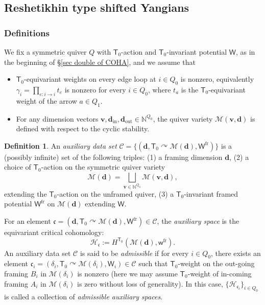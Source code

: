 \documentclass[10pt]{amsart}
\theoremstyle{definition}
\newtheorem{Definition}[Theorem]{Definition}
\numberwithin{equation}{section}
\newcommand{\bN}{\mathbb{N}}
\newcommand{\bv}{\mathbf{v}}
\newcommand{\bd}{\mathbf{d}}
\newcommand{\cM}{\mathcal{M}}
\newcommand{\sT}{\mathsf{T}}
\newcommand{\sW}{\mathsf{W}}
\newcommand{\sw}{\mathsf{w}}
\newcommand{\In}{\operatorname{in}}
\newcommand{\Out}{\operatorname{out}}
\begin{document}
\subsection{Reshetikhin type shifted Yangians}


\subsubsection{Definitions}

We fix a symmetric quiver $Q$ with $\sT_0$-action and $\sT_0$-invariant potential $\sW$, as in the beginning of \S\ref{sec double of COHA}, and we assume that
\begin{itemize}
    \item $\sT_0$-equivariant weights on every edge loop at $i\in Q_0$ is nonzero, equivalently $\gamma_i=\prod_{e:i\to i}t_e$ is nonzero for every $i\in Q_0$, where $t_a$ is the $\sT_0$-equivariant weight of the arrow $a\in Q_1$.
    \item For any dimension vectors $\bv,\bd_{\In},\bd_{\Out}\in \bN^{Q_0}$, the quiver variety $\cM(\bv,\bd)$ is defined with respect to the cyclic stability. 
\end{itemize}


\begin{Definition}\label{def on adm aux data}
An \textit{auxiliary data set} $\mathcal C=\{(\bd,\sT_0\curvearrowright\cM(\bd),\sW^{\mathrm{fr}})\}$ is a (possibly infinite) set of the following triples: (1) a framing dimension $\bd$, (2) a choice of $\sT_0$-action on the symmetric quiver variety 
$$\cM(\bd)=\bigsqcup_{\bv\in \bN^{Q_0}} \cM(\bv,\bd),$$ 
extending the $\sT_0$-action on the unframed quiver, (3) a $\sT_0$-invariant framed potential $\sW^{\mathrm{fr}}$ on $\cM(\bd)$ extending $\sW$.


For an element $\mathfrak{c}=(\bd,\sT_0\curvearrowright\cM(\bd),\sW^{\mathrm{fr}})\in \mathcal C$, the \textit{auxiliary space} is the equivariant critical cohomology:
\begin{equation}\label{equ on aux sp}\mathcal H_{\mathfrak{c}}:=H^{\sT_0}(\cM(\bd),\sw^{\mathrm{fr}}). \end{equation} 
An auxiliary data set $\mathcal C$ is said to be \textit{admissible} if for every $i\in Q_0$, there exists an element $\mathfrak{c}_i=(\delta_i,\sT_0\curvearrowright\cM(\delta_i),\sW_i)\in \mathcal C$ such that $\sT_0$-weight on the out-going framing $B_i$ in $\cM(\delta_i)$ is nonzero (here we may assume $\sT_0$-weight of in-coming framing $A_i$ in $\cM(\delta_i)$ is zero without loss of generality).
In this case, $\{\mathcal H_{\mathfrak{c}_i}\}_{i\in Q_0}$ is called a collection of \textit{admissible auxiliary spaces}.
\end{Definition}
\end{document}
